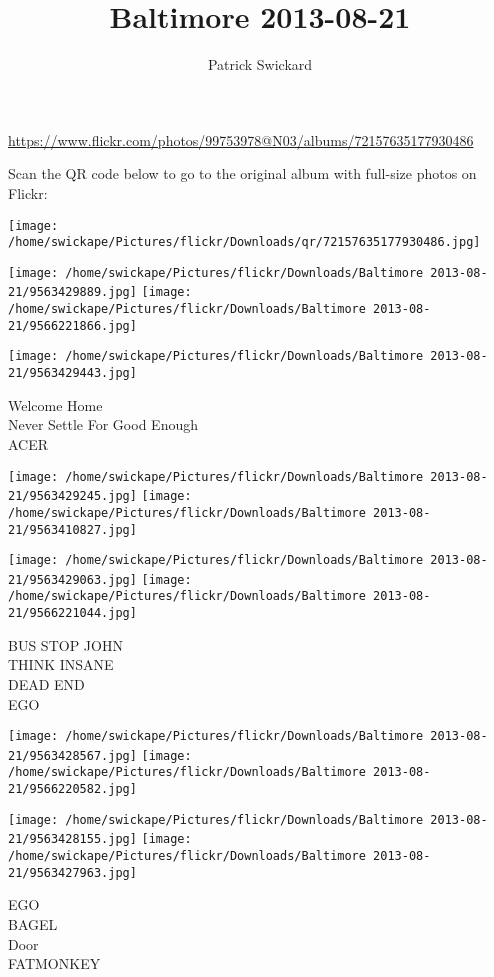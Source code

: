 \documentclass[10pt,letterpaper]{article}
\title{Baltimore 2013-08-21}
\author{Patrick Swickard}
\date{}
\begin{document}
\maketitle

\url{https://www.flickr.com/photos/99753978@N03/albums/72157635177930486}

Scan the QR code below to go to the original album with full-size photos on Flickr:

\texttt{[image: /home/swickape/Pictures/flickr/Downloads/qr/72157635177930486.jpg]}
\pagebreak

\texttt{[image: /home/swickape/Pictures/flickr/Downloads/Baltimore 2013-08-21/9563429889.jpg]}
\texttt{[image: /home/swickape/Pictures/flickr/Downloads/Baltimore 2013-08-21/9566221866.jpg]}

\vspace{0.25in}
\texttt{[image: /home/swickape/Pictures/flickr/Downloads/Baltimore 2013-08-21/9563429443.jpg]}

Welcome Home\\
Never Settle For Good Enough\\
ACER
\pagebreak

\texttt{[image: /home/swickape/Pictures/flickr/Downloads/Baltimore 2013-08-21/9563429245.jpg]}
\texttt{[image: /home/swickape/Pictures/flickr/Downloads/Baltimore 2013-08-21/9563410827.jpg]}

\texttt{[image: /home/swickape/Pictures/flickr/Downloads/Baltimore 2013-08-21/9563429063.jpg]}
\texttt{[image: /home/swickape/Pictures/flickr/Downloads/Baltimore 2013-08-21/9566221044.jpg]}

BUS STOP JOHN\\
THINK INSANE\\
DEAD END\\
EGO
\pagebreak

\texttt{[image: /home/swickape/Pictures/flickr/Downloads/Baltimore 2013-08-21/9563428567.jpg]}
\texttt{[image: /home/swickape/Pictures/flickr/Downloads/Baltimore 2013-08-21/9566220582.jpg]}

\texttt{[image: /home/swickape/Pictures/flickr/Downloads/Baltimore 2013-08-21/9563428155.jpg]}
\texttt{[image: /home/swickape/Pictures/flickr/Downloads/Baltimore 2013-08-21/9563427963.jpg]}

EGO\\
BAGEL\\
Door\\
FATMONKEY
\pagebreak
\end{document}
